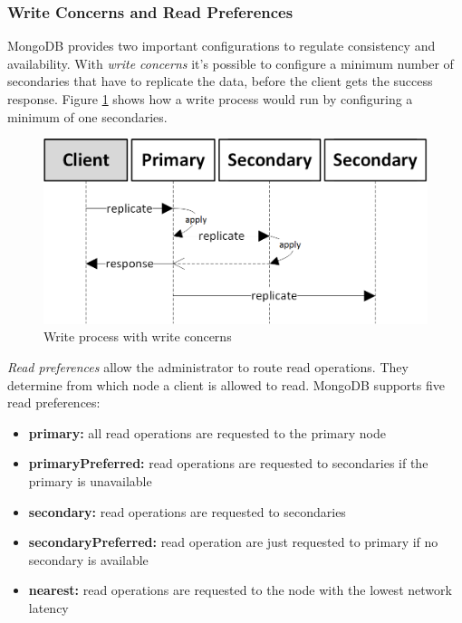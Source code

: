 \subsubsection{Write Concerns and Read Preferences}\label{read-write}
MongoDB provides two important configurations to regulate consistency and availability. With \textit{write concerns} it's possible to configure a minimum number of secondaries that have to replicate the data, before the client gets the success response. Figure \ref{write-concerns} shows how a write process would run by configuring a minimum of one secondaries.
\begin{figure}[H]
\includegraphics[width=\linewidth,keepaspectratio]{images/write-concern.png}
\caption{Write process with write concerns}
\label{write-concerns}
\end{figure}
\textit{Read preferences} allow the administrator to route read operations. They determine from which node a client is allowed to read. MongoDB supports five read preferences:
\begin{itemize}
  \item \textbf{primary:} all read operations are requested to the primary node
  \item \textbf{primaryPreferred:} read operations are requested to secondaries if the primary is unavailable
  \item \textbf{secondary:} read operations are requested to secondaries
  \item \textbf{secondaryPreferred:} read operation are just requested to primary if no secondary is available
  \item \textbf{nearest:} read operations are requested to the node with the lowest network latency
\end{itemize}
\cite{mdbdocu}
